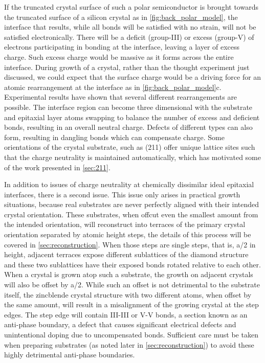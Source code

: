 If the truncated crystal surface of such a polar semiconductor is brought towards the truncated surface of a silicon crystal as in \cref{fig:back_polar_model}, the interface that results, while all bonds will be satisfied with no strain, will not be satisfied electronically.
There will be a deficit (group-III) or excess (group-V) of electrons participating in bonding at the interface, leaving a layer of excess charge.
Such excess charge would be massive as it forms across the entire interface.
During growth of a crystal, rather than the thought experiment just discussed, we could expect that the surface charge would be a driving force for an atomic rearrangement at the interface as in \cref{fig:back_polar_model}c.
Experimental results have shown that several different rearrangements are possible.
The interface region can become three dimensional with the substrate and epitaxial layer atoms swapping to balance the number of excess and deficient bonds, resulting in an overall neutral charge.
Defects of different types can also form, resulting in dangling bonds which can compensate charge.
Some orientations of the crystal substrate, such as (211) offer unique lattice sites such that the charge neutrality is maintained automatically, which has motivated some of the work presented in \cref{sec:211}.

In addition to issues of charge neutrality at chemically dissimilar ideal epitaxial interfaces, there is a second issue.
This issue only arises in practical growth situations, because real substrates are never perfectly aligned with their intended crystal orientation.
These substrates, when offcut even the smallest amount from the intended orientation, will reconstruct into terraces of the primary crystal orientation separated by atomic height steps, the details of this process will be covered in \cref{sec:reconstruction}.
When those steps are single steps, that is, a/2 in height, adjacent terraces expose different sublattices of the diamond structure and these two sublattices have their exposed bonds rotated relative to each other.
When a crystal is grown atop such a substrate, the growth on adjacent crystals will also be offset by a/2.
While such an offset is not detrimental to the substrate itself, the zincblende crystal structure with two different atoms, when offset by the same amount, will result in a misalignment of the growing crystal at the step edges.
The step edge will contain III-III or V-V bonds, a section known as an anti-phase boundary, a defect that causes significant electrical defects and unintentional doping due to uncompensated bonds.
Sufficient care must be taken when preparing substrates (as noted later in \cref{sec:reconstruction}) to avoid these highly detrimental anti-phase boundaries.


